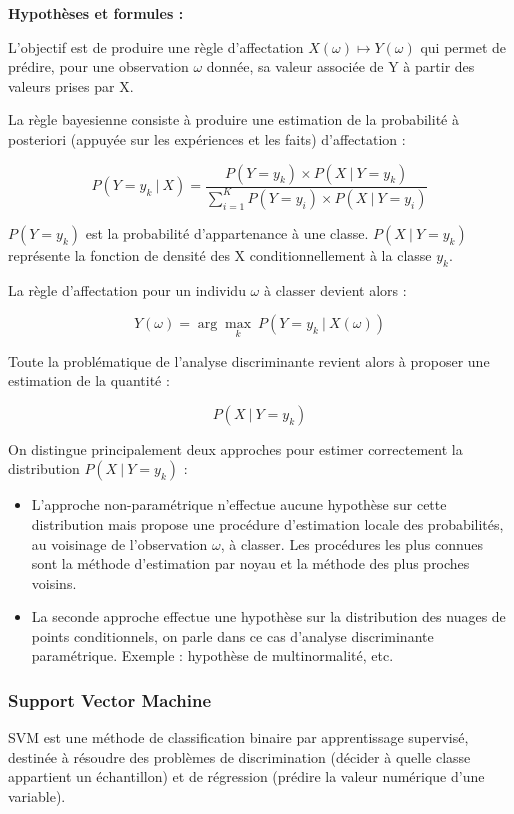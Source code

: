 \textbf{Hypothèses et formules : }
\smallbreak

L’objectif est de produire une règle d’affectation $X(\omega) \mapsto Y(\omega)$ qui permet de prédire, pour une observation $\omega$ donnée, sa valeur associée de Y à partir des valeurs prises par X.

La règle bayesienne consiste à produire une estimation de la probabilité à posteriori (appuyée sur les expériences et les faits) d’affectation :

\begin{equation}
P(Y=y_k ~|~ X) = \frac{P(Y=y_k) \times P(X ~|~ Y=y_k)}{\sum_{i=1}^K P(Y=y_i) \times P(X ~|~ Y=y_i)}
\end{equation}

$P(Y=y_k)$ est la probabilité d’appartenance à une classe. $P(X ~|~ Y=y_k)$ représente la fonction de densité des X conditionnellement à la classe $y_k$.

La règle d’affectation pour un individu $\omega$ à classer devient alors :

\begin{equation}
Y(\omega) = \arg\max_{k}\ P(Y=y_k ~|~ X(\omega))
\end{equation}

Toute la problématique de l’analyse discriminante revient alors à proposer une estimation de la quantité :

\begin{equation}
P(X ~|~ Y = y_k)
\end{equation}

On distingue principalement deux approches pour estimer correctement la distribution $P(X ~|~ Y=y_k)$ :
\smallbreak
\begin{itemize}
	\item L’approche non-paramétrique n’effectue aucune hypothèse sur cette distribution mais propose une procédure d’estimation locale des probabilités, au voisinage de l’observation $\omega$, à classer. Les procédures les plus connues sont la méthode d'estimation par noyau et la méthode des plus proches voisins.
	\smallbreak
	\item La seconde approche effectue une hypothèse sur la distribution des nuages de points conditionnels, on parle dans ce cas d’analyse discriminante paramétrique. Exemple : hypothèse de multinormalité, etc.
	\smallbreak
\end{itemize}

\subsubsection{Support Vector Machine}
\label{subsubsection : 4.Support Vector Machine}
SVM est une méthode de classification binaire par apprentissage supervisé, destinée à résoudre des problèmes de discrimination (décider à quelle classe appartient un échantillon) et de régression (prédire la valeur numérique d'une variable). 

